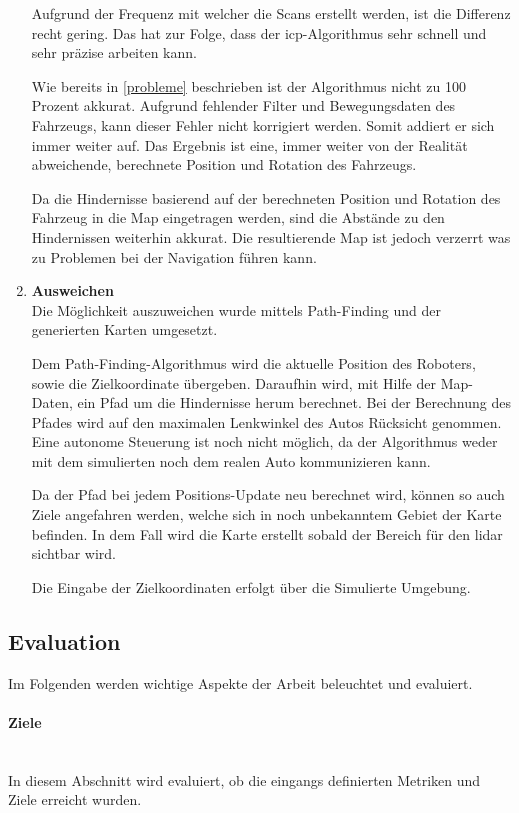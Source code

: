 \begin{enumerate}[leftmargin=*]
    Aufgrund der Frequenz mit welcher die Scans erstellt werden, ist die Differenz recht gering.
    Das hat zur Folge, dass der \ac{icp}-Algorithmus sehr schnell und sehr präzise arbeiten kann.
    
    Wie bereits in \ref{probleme} beschrieben ist der Algorithmus nicht zu 100 Prozent akkurat.
    Aufgrund fehlender Filter und Bewegungsdaten des Fahrzeugs, kann dieser Fehler nicht korrigiert werden.
    Somit addiert er sich immer weiter auf.
    Das Ergebnis ist eine, immer weiter von der Realität abweichende, berechnete Position und Rotation des Fahrzeugs.

    Da die Hindernisse basierend auf der berechneten Position und Rotation des Fahrzeug in die Map eingetragen werden,
    sind die Abstände zu den Hindernissen weiterhin akkurat.
    Die resultierende Map ist jedoch verzerrt was zu Problemen bei der Navigation führen kann.

    \item \textbf{Ausweichen} \\
    Die Möglichkeit auszuweichen wurde mittels Path-Finding und der generierten Karten umgesetzt.
    
    Dem Path-Finding-Algorithmus wird die aktuelle Position des Roboters, sowie die Zielkoordinate übergeben.
    Daraufhin wird, mit Hilfe der Map-Daten, ein Pfad um die Hindernisse herum berechnet.
    Bei der Berechnung des Pfades wird auf den maximalen Lenkwinkel des Autos Rücksicht genommen.
    Eine autonome Steuerung ist noch nicht möglich, da der Algorithmus weder mit dem simulierten noch dem realen Auto kommunizieren kann.

    Da der Pfad bei jedem Positions-Update neu berechnet wird, können so auch Ziele angefahren werden,
    welche sich in noch unbekanntem Gebiet der Karte befinden.
    In dem Fall wird die Karte erstellt sobald der Bereich für den \ac{lidar} sichtbar wird.

    Die Eingabe der Zielkoordinaten erfolgt über die Simulierte Umgebung.
\end{enumerate}

\subsection{Evaluation}
Im Folgenden werden wichtige Aspekte der Arbeit beleuchtet und evaluiert.

\paragraph{Ziele} \mbox{}\\
In diesem Abschnitt wird evaluiert, ob die eingangs definierten Metriken und Ziele erreicht wurden.

